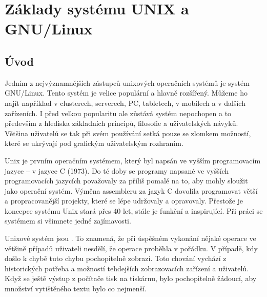 \documentclass{article}
\begin{document}
\section{Základy systému UNIX a GNU/Linux}
\subsection{Úvod}
Jedním z nejvýznamnějších zástupců unixových operačních systémů je systém GNU/Linux. Tento systém je velice populární a hlavně rozšířený. Můžeme ho
najít například v clusterech, serverech, PC, tabletech, v mobilech a v dalších zařízeních. I před velkou popularitu ale zůstává systém nepochopen a to
především z hlediska základních principů, filosofie a uživatelských návyků. Většina  uživatelů se tak při svém používání setká pouze se zlomkem možností, které se ukrývají pod grafickým uživatelským rozhraním. 

Unix je prvním operačním systémem, který byl napsán ve vyšším programovacím jazyce -- v jazyce C (1973). Do té doby se programy napsané ve vyšších programovacích jazycích považovaly za příliš pomalé na to, aby mohly sloužit jako operační systém. Výměna assembleru za jazyk C dovolila programovat větší a propracovanější projekty, které se lépe udržovaly a opravovaly. Přestože je koncepce systému Unix stará přes 40 let, stále je funkční a inspirující. Při práci se systémem si všimnete jedné zajímavosti.

Unixové systém jsou . To znamená, že při úspěšném vykonání nějaké operace ve většině případů uživateli nesdělí, že operace proběhla v pořádku. V případě, kdy došlo k chybě tuto chybu pochopitelně zobrazí. Toto chování vychází z historických potřeba a možností tehdejších zobrazovacích zařízení a uživatelů. Když se ještě výstup z počítače tisk na tiskárnu, bylo pochopitelně žádoucí, aby množství vytištěného textu bylo co nejmenší.
\end{document}
